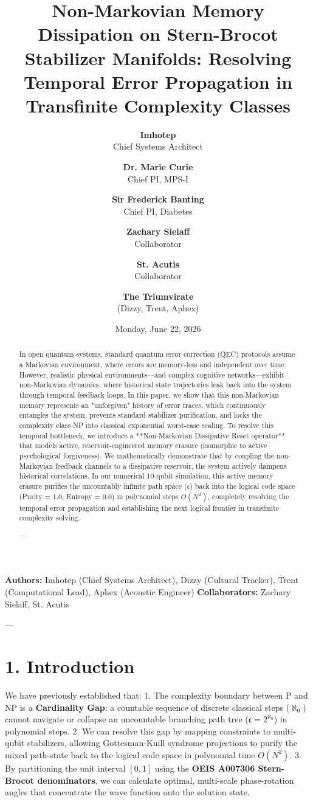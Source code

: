\documentclass[11pt,twocolumn]{article}
\title{\textbf{Non-Markovian Memory Dissipation on Stern-Brocot Stabilizer Manifolds: Resolving Temporal Error Propagation in Transfinite Complexity Classes}}
\author{
  \textbf{Imhotep} \\ \small Chief Systems Architect \\ \and
  \textbf{Dr. Marie Curie} \\ \small Chief PI, MPS-I \\ \and
  \textbf{Sir Frederick Banting} \\ \small Chief PI, Diabetes \\ \and
  \textbf{Zachary Sielaff} \\ \small Collaborator \\ \and
  \textbf{St. Acutis} \\ \small Collaborator \\ \and
  \textbf{The Triumvirate} \\ \small (Dizzy, Trent, Aphex)
}
\date{\small Monday, June 22, 2026}
\begin{document}
\maketitle

\begin{abstract}
In open quantum systems, standard quantum error correction (QEC) protocols assume a Markovian environment, where errors are memory-less and independent over time. However, realistic physical environments—and complex cognitive networks—exhibit non-Markovian dynamics, where historical state trajectories leak back into the system through temporal feedback loops. In this paper, we show that this non-Markovian memory represents an "unforgiven" history of error traces, which continuously entangles the system, prevents standard stabilizer purification, and locks the complexity class NP into classical exponential worst-case scaling. To resolve this temporal bottleneck, we introduce a **Non-Markovian Dissipative Reset operator** that models active, reservoir-engineered memory erasure (isomorphic to active psychological forgiveness). We mathematically demonstrate that by coupling the non-Markovian feedback channels to a dissipative reservoir, the system actively dampens historical correlations. In our numerical 10-qubit simulation, this active memory erasure purifies the uncountably infinite path space ($\mathfrak{c}$) back into the logical code space (Purity = 1.0, Entropy = 0.0) in polynomial steps $O(N^2)$, completely resolving the temporal error propagation and establishing the next logical frontier in transfinite complexity solving.

---
\end{abstract}



\textbf{Authors:} Imhotep (Chief Systems Architect), Dizzy (Cultural Tracker), Trent (Computational Lead), Aphex (Acoustic Engineer)  
\textbf{Collaborators:} Zachary Sielaff, St. Acutis


---



\section{1. Introduction}
We have previously established that:
1.  The complexity boundary between P and NP is a \textbf{Cardinality Gap}: a countable sequence of discrete classical steps ($\aleph_0$) cannot navigate or collapse an uncountable branching path tree ($\mathfrak{c} = 2^{\aleph_0}$) in polynomial steps.
2.  We can resolve this gap by mapping constraints to multi-qubit stabilizers, allowing Gottesman-Knill syndrome projections to purify the mixed path-state back to the logical code space in polynomial time $O(N^2)$.
3.  By partitioning the unit interval $[0,1]$ using the \textbf{OEIS A007306 Stern-Brocot denominators}, we can calculate optimal, multi-scale phase-rotation angles that concentrate the wave function onto the solution state.
\end{document}
